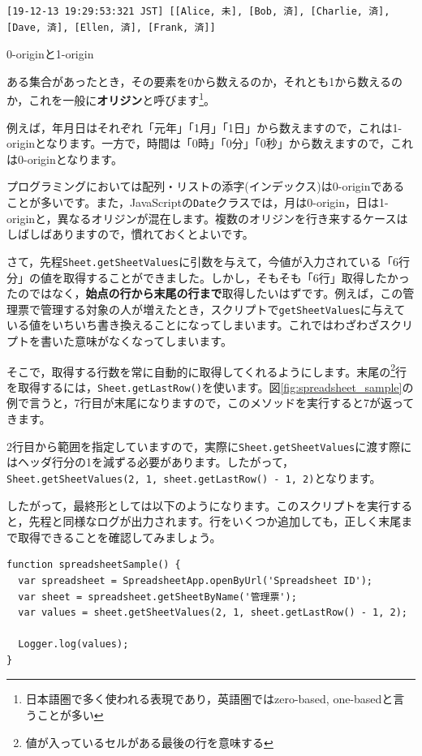 \documentclass[uplatex,a4j]{jsarticle}
\begin{document}
\begin{lstlisting}[basicstyle=\ttfamily\footnotesize,frame=single,caption=SpreadsheetApp output sample 1]
[19-12-13 19:29:53:321 JST] [[Alice, 未], [Bob, 済], [Charlie, 済], [Dave, 済], [Ellen, 済], [Frank, 済]]
\end{lstlisting}

\begin{itembox}[l]{0-originと1-origin}

ある集合があったとき，その要素を0から数えるのか，それとも1から数えるのか，これを一般に\textbf{オリジン}と呼びます\footnote{日本語圏で多く使われる表現であり，英語圏ではzero-based, one-basedと言うことが多い}。

例えば，年月日はそれぞれ「元年」「1月」「1日」から数えますので，これは1-originとなります。一方で，時間は「0時」「0分」「0秒」から数えますので，これは0-originとなります。

プログラミングにおいては配列・リストの添字(インデックス)は0-originであることが多いです。また，JavaScriptの\verb|Date|クラスでは，月は0-origin，日は1-originと，異なるオリジンが混在します。複数のオリジンを行き来するケースはしばしばありますので，慣れておくとよいです。

\end{itembox}


さて，先程\verb|Sheet.getSheetValues|に引数を与えて，今値が入力されている「6行分」の値を取得することができました。しかし，そもそも「6行」取得したかったのではなく，\textbf{始点の行から末尾の行まで}取得したいはずです。例えば，この管理票で管理する対象の人が増えたとき，スクリプトで\verb|getSheetValues|に与えている値をいちいち書き換えることになってしまいます。これではわざわざスクリプトを書いた意味がなくなってしまいます。

そこで，取得する行数を常に自動的に取得してくれるようにします。末尾の\footnote{値が入っているセルがある最後の行を意味する}行を取得するには，\verb|Sheet.getLastRow()|を使います。図\ref{fig:spreadsheet_sample}の例で言うと，7行目が末尾になりますので，このメソッドを実行すると7が返ってきます。

2行目から範囲を指定していますので，実際に\verb|Sheet.getSheetValues|に渡す際にはヘッダ行分の1を減ずる必要があります。したがって，\verb|Sheet.getSheetValues(2, 1, sheet.getLastRow() - 1, 2)|となります。

したがって，最終形としては以下のようになります。このスクリプトを実行すると，先程と同様なログが出力されます。行をいくつか追加しても，正しく末尾まで取得できることを確認してみましょう。

\begin{lstlisting}[basicstyle=\ttfamily\footnotesize,frame=single,caption=SpreadsheetApp sample 5]
function spreadsheetSample() {
  var spreadsheet = SpreadsheetApp.openByUrl('Spreadsheet ID');
  var sheet = spreadsheet.getSheetByName('管理票');
  var values = sheet.getSheetValues(2, 1, sheet.getLastRow() - 1, 2);
  
  Logger.log(values);
}
\end{lstlisting}
\end{document}
